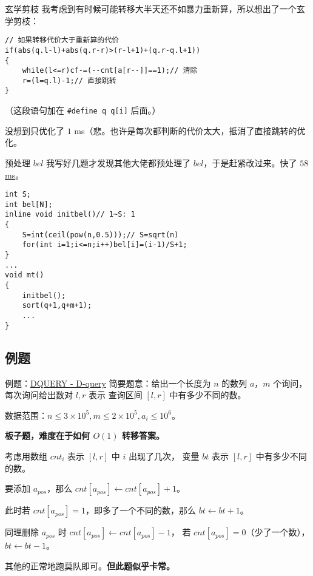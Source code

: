 \documentclass[table]{beamer}
\begin{document}
\begin{frame}[fragile]{玄学剪枝}
	我考虑到有时候可能转移大半天还不如暴力重新算，所以想出了一个玄学剪枝：
	\begin{verbatim}
// 如果转移代价大于重新算的代价
if(abs(q.l-l)+abs(q.r-r)>(r-l+1)+(q.r-q.l+1))
{
    while(l<=r)cf-=(--cnt[a[r--]]==1);// 清除
    r=(l=q.l)-1;// 直接跳转
}
\end{verbatim}
	（这段语句加在 \verb|#define q q[i]| 后面。）

	没想到只优化了 $1$ ms（悲。也许是每次都判断的代价太大，抵消了直接跳转的优化。
\end{frame}

\begin{frame}[fragile]{预处理 $bel$}
	我写好几题才发现其他大佬都预处理了 $bel$，于是赶紧改过来。快了 \href{https://www.luogu.com.cn/record/138365971}{\color{blue}$58$ ms}。
	\small
\begin{verbatim}
int S;
int bel[N];
inline void initbel()// 1~S: 1
{
    S=int(ceil(pow(n,0.5)));// S=sqrt(n)
    for(int i=1;i<=n;i++)bel[i]=(i-1)/S+1;
}
...
void mt()
{
    initbel();
    sort(q+1,q+m+1);
    ...
}
\end{verbatim}
\end{frame}

\subsection{例题}

\begin{frame}
{例题：{\color{blue}\href{https://www.luogu.com.cn/problem/SP3267}{DQUERY - D-query}}}
	简要题意：给出一个长度为 $n$ 的数列 $a$，$m$ 个询问，每次询问给出数对 $l,r$ 表示
	查询区间 $[l,r]$ 中有多少不同的数。

	数据范围：$n\le 3\times10^5,m\le2\times10^5,a_i\le10^6$。
	\pause

	\textbf{板子题，难度在于如何 $O(1)$ 转移答案。}
	\pause

	考虑用数组 $cnt_i$ 表示 $[l,r]$ 中 $i$ 出现了几次，
	变量 $bt$ 表示 $[l,r]$ 中有多少不同的数。
	
	要添加 $a_{pos}$，那么 $cnt[a_{pos}]\gets cnt[a_{pos}]+1$。

	此时若 $cnt[a_{pos}]=1$，即多了一个不同的数，那么 $bt\gets bt+1$。

	同理删除 $a_{pos}$ 时 $cnt[a_{pos}]\gets cnt[a_{pos}]-1$，
	若 $cnt[a_{pos}]=0$（少了一个数），$bt\gets bt-1$。

	其他的正常地跑莫队即可。\textbf{但此题似乎卡常。}
\end{frame}
\end{document}
